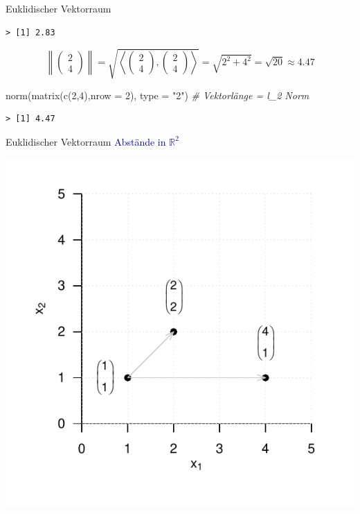 \documentclass[
  8pt,
  ignorenonframetext,
]{beamer}
\newenvironment{Shaded}{\begin{snugshade}}{\end{snugshade}}
\newcommand{\AttributeTok}[1]{\textcolor[rgb]{0.77,0.63,0.00}{#1}}
\newcommand{\CommentTok}[1]{\textcolor[rgb]{0.56,0.35,0.01}{\textit{#1}}}
\newcommand{\DecValTok}[1]{\textcolor[rgb]{0.00,0.00,0.81}{#1}}
\newcommand{\FunctionTok}[1]{\textcolor[rgb]{0.00,0.00,0.00}{#1}}
\newcommand{\NormalTok}[1]{#1}
\newcommand{\StringTok}[1]{\textcolor[rgb]{0.31,0.60,0.02}{#1}}
\begin{document}
\begin{frame}[fragile]{Euklidischer Vektorraum}
\begin{verbatim}
> [1] 2.83
\end{verbatim}

\begin{equation}
\left\lVert \begin{pmatrix} 2 \\ 4 \end{pmatrix} \right\rVert
= \sqrt{\left\langle \begin{pmatrix} 2 \\ 4 \end{pmatrix}, \begin{pmatrix} 2 \\ 4 \end{pmatrix} \right\rangle}
= \sqrt{2^2 + 4^2}
= \sqrt{20}
\approx 4.47
\end{equation}

\begin{Shaded}
\begin{Highlighting}[]
\FunctionTok{norm}\NormalTok{(}\FunctionTok{matrix}\NormalTok{(}\FunctionTok{c}\NormalTok{(}\DecValTok{2}\NormalTok{,}\DecValTok{4}\NormalTok{),}\AttributeTok{nrow =} \DecValTok{2}\NormalTok{), }\AttributeTok{type =} \StringTok{"2"}\NormalTok{)             }\CommentTok{\# Vektorlänge = l\_2 Norm}
\end{Highlighting}
\end{Shaded}

\begin{verbatim}
> [1] 4.47
\end{verbatim}
\end{frame}

\begin{frame}{Euklidischer Vektorraum}
\protect\hypertarget{euklidischer-vektorraum-6}{}
\textcolor{darkblue}{Abstände in $\mathbb{R}^2$}

\begin{center}\includegraphics[width=0.6\linewidth]{2_Abbildungen/mvda_2_abstand_R2} \end{center}
\end{frame}
\end{document}
